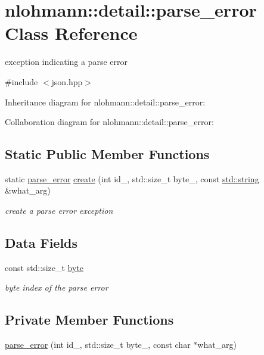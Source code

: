 \hypertarget{classnlohmann_1_1detail_1_1parse__error}{}\section{nlohmann\+:\+:detail\+:\+:parse\+\_\+error Class Reference}
\label{classnlohmann_1_1detail_1_1parse__error}


exception indicating a parse error  




{\ttfamily \#include $<$json.\+hpp$>$}



Inheritance diagram for nlohmann\+:\+:detail\+:\+:parse\+\_\+error\+:


Collaboration diagram for nlohmann\+:\+:detail\+:\+:parse\+\_\+error\+:
\subsection*{Static Public Member Functions}
\begin{DoxyCompactItemize}
\item 
static \hyperlink{classnlohmann_1_1detail_1_1parse__error}{parse\+\_\+error} \hyperlink{classnlohmann_1_1detail_1_1parse__error_a9fd60ad6bce80fd99686ad332faefd37}{create} (int id\+\_\+, std\+::size\+\_\+t byte\+\_\+, const \hyperlink{namespacenlohmann_1_1detail_a1ed8fc6239da25abcaf681d30ace4985ab45cffe084dd3d20d928bee85e7b0f21}{std\+::string} \&what\+\_\+arg)
\begin{DoxyCompactList}\small\item\em create a parse error exception \end{DoxyCompactList}\end{DoxyCompactItemize}
\subsection*{Data Fields}
\begin{DoxyCompactItemize}
\item 
const std\+::size\+\_\+t \hyperlink{classnlohmann_1_1detail_1_1parse__error_a9505aaa1ca943be927eec7cc579592ff}{byte}
\begin{DoxyCompactList}\small\item\em byte index of the parse error \end{DoxyCompactList}\end{DoxyCompactItemize}
\subsection*{Private Member Functions}
\begin{DoxyCompactItemize}
\item 
\hyperlink{classnlohmann_1_1detail_1_1parse__error_a0ea816ea3521d7109407948cb1b850f7}{parse\+\_\+error} (int id\+\_\+, std\+::size\+\_\+t byte\+\_\+, const char $\ast$what\+\_\+arg)
\end{DoxyCompactItemize}
